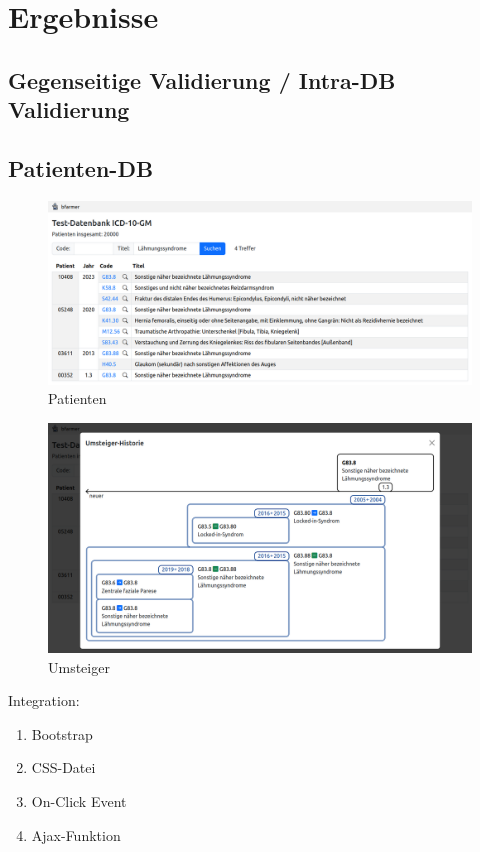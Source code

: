 \section{Ergebnisse}

\subsection{Gegenseitige Validierung / Intra-DB Validierung}

\newpage

\subsection{Patienten-DB}

\begin{figure}[H]
    \centering
    \includegraphics[width=.8\linewidth]{../img/patients_screenshot.png}
    \caption{Patienten}
\end{figure}

\begin{figure}[H]
    \centering
    \includegraphics[width=.8\linewidth]{../img/umsteiger_screenshot.png}
    \caption{Umsteiger}
\end{figure}

Integration:

\begin{enumerate}
\item Bootstrap
\item CSS-Datei
\item On-Click Event
\item Ajax-Funktion
\end{enumerate}

